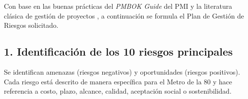 Con base en las buenas prácticas del \textit{PMBOK Guide} del PMI \cite{PMBOK} y la literatura clásica de gestión de proyectos \cite{Kerzner2017}, a continuación se formula el Plan de Gestión de Riesgos solicitado.

\newpage

\subsection{1. Identificación de los 10 riesgos principales}

Se identifican amenazas (riesgos negativos) y oportunidades (riesgos positivos). Cada riesgo está descrito de manera específica para el Metro de la 80 y hace referencia a costo, plazo, alcance, calidad, aceptación social o sostenibilidad.

